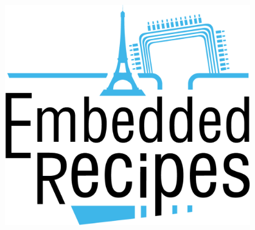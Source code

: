 \begin{frame}
\begin{columns}
\begin{center}
      \includegraphics[width=0.8\textwidth]{slides/sysdev-references/embedded-recipes.png}\\
    \end{center}
  \end{columns}
\end{frame}
